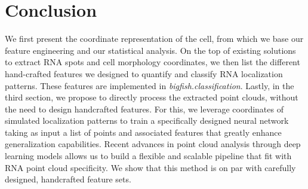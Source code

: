 \section{Conclusion}
\label{sec:analysis_conclusion}

We first present the coordinate representation of the cell, from which we base our feature engineering and our statistical analysis.
On the top of existing solutions to extract \ac{RNA} spots and cell morphology coordinates, we then list the different hand-crafted features we designed to quantify and classify \ac{RNA} localization patterns.
These features are implemented in \emph{bigfish.classification}.
Lastly, in the third section, we propose to directly process the extracted point clouds, without the need to design handcrafted features.
For this, we leverage coordinates of simulated localization patterns to train a specifically designed neural network taking as input a list of points and associated features that greatly enhance generalization capabilities.
Recent advances in point cloud analysis through deep learning models allows us to build a flexible and scalable pipeline that fit with \ac{RNA} point cloud specificity.
We show that this method is on par with carefully designed, handcrafted feature sets.

